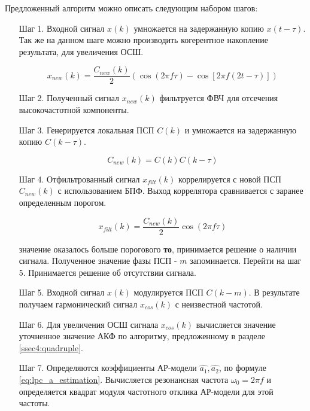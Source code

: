 Предложенный алгоритм можно описать следующим набором шагов:
\begin{itemize}
\item[Шаг 1.] Входной сигнал ${x(k)}$ умножается на задержанную копию ${x(t-\tau)}$. Так же
	на данном шаге можно производить когерентное накопление результата, для
	увеличения ОСШ.

	\begin{center}
	\begin{equation}
		x_{new}(k) = \frac{C_{new}(k)}{2} \left(\cos (2\pi f \tau) - \cos \left[2 \pi f (2t - \tau)\right]\right)
	\end{equation}
	\end{center}

\item[Шаг 2.] Полученный сигнал ${x_{new}(k)}$ фильтруется ФВЧ для отсечения высокочастотной компоненты.
\item[Шаг 3.] Генерируется локальная ПСП ${C(k)}$ и умножается на задержанную копию ${C(k-\tau)}$.

	\begin{center}
	\begin{equation}
		C_{new}(k) = C(k)C(k-\tau)
	\end{equation}
	\end{center}

\item[Шаг 4.] Отфильтрованный сигнал ${x_{filt}(k)}$ коррелируется с новой ПСП ${C_{new}(k)}$
	с использованием БПФ. Выход коррелятора сравнивается с заранее определенным порогом.

	\begin{center}
	\begin{equation}
		x_{filt}(k) = \frac{C_{new}(k)}{2} \cos (2\pi f \tau)
	\end{equation}
	\end{center}

	  значение оказалось больше порогового {\bf{то}},
		принимается решение о наличии сигнала. Полученное значение фазы ПСП  - ${m}$ запоминается.
		Перейти на шаг 5.
		Принимается решение об отсутствии сигнала.
\item[Шаг 5.] Входной сигнал ${x(k)}$ модулируется ПСП ${C(k-m)}$. В результате получаем гармонический
	сигнал ${x_{cos}(k)}$ с неизвестной частотой.
\item[Шаг 6.] Для увеличения ОСШ сигнала ${x_{cos}(k)}$ вычисляется значение уточненное значение АКФ
	по алгоритму, предложенному в разделе \ref{ssec4:quadruple}.
\item[Шаг 7.] Определяются коэффициенты АР-модели ${\hat{a_1}, \hat{a_2}}$, по формуле \ref{eq:lpc_a_estimation}. 
	Вычисляется резонансная частота ${\omega_0 = 2 \pi f}$ и определяется квадрат модуля частотного отклика АР-модели для этой частоты. 
\end{itemize}


